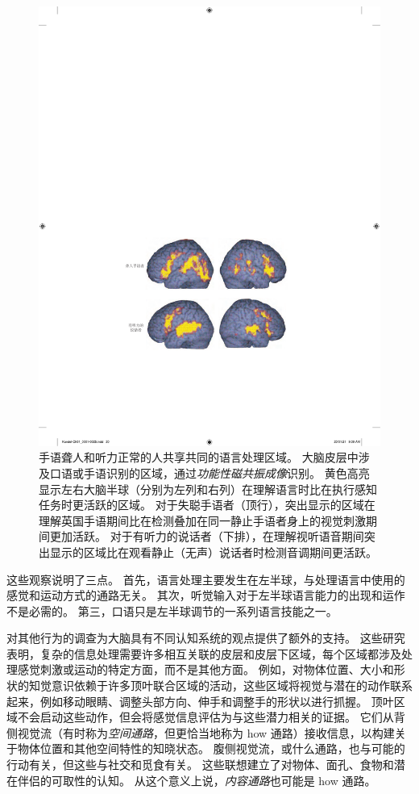 \begin{figure}[htbp]
	\centering
	\includegraphics[width=0.82\linewidth]{chap01/fig_1_8}
	\caption{手语聋人和听力正常的人共享共同的语言处理区域。
		大脑皮层中涉及口语或手语识别的区域，通过\textit{功能性磁共振成像}识别。
		黄色高亮显示左右大脑半球（分别为左列和右列）在理解语言时比在执行感知任务时更活跃的区域。
		对于失聪手语者（顶行），突出显示的区域在理解英国手语期间比在检测叠加在同一静止手语者身上的视觉刺激期间更加活跃。
		对于有听力的说话者（下排），在理解视听语音期间突出显示的区域比在观看静止（无声）说话者时检测音调期间更活跃\cite{macsweeney2002neural}。}
	\label{fig:1_8}
\end{figure}


这些观察说明了三点。
首先，语言处理主要发生在左半球，与处理语言中使用的感觉和运动方式的通路无关。
其次，听觉输入对于左半球语言能力的出现和运作不是必需的。
第三，口语只是左半球调节的一系列语言技能之一。


对其他行为的调查为大脑具有不同认知系统的观点提供了额外的支持。
这些研究表明，复杂的信息处理需要许多相互关联的皮层和皮层下区域，每个区域都涉及处理感觉刺激或运动的特定方面，而不是其他方面。
例如，对物体位置、大小和形状的知觉意识依赖于许多顶叶联合区域的活动，这些区域将视觉与潜在的动作联系起来，例如移动眼睛、调整头部方向、伸手和调整手的形状以进行抓握。
顶叶区域不会启动这些动作，但会将感觉信息评估为与这些潜力相关的证据。
它们从背侧视觉流（有时称为\textit{空间通路}，但更恰当地称为 how 通路）接收信息，以构建关于物体位置和其他空间特性的知晓状态。
腹侧视觉流，或什么通路，也与可能的行动有关，但这些与社交和觅食有关。
这些联想建立了对物体、面孔、食物和潜在伴侣的可取性的认知。
从这个意义上说，\textit{内容通路}也可能是 how 通路。



